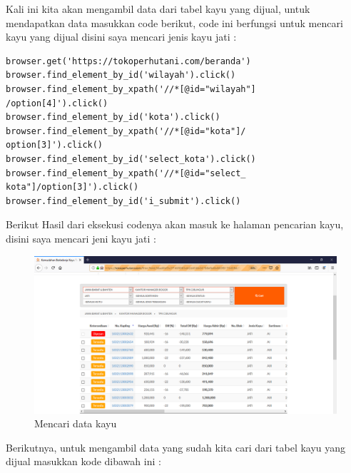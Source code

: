 Kali ini kita akan mengambil data dari tabel kayu yang dijual, untuk mendapatkan data masukkan code berikut, code ini berfungsi untuk mencari kayu yang dijual disini saya mencari jenis kayu jati :

\begin{verbatim}
browser.get('https://tokoperhutani.com/beranda')
browser.find_element_by_id('wilayah').click()
browser.find_element_by_xpath('//*[@id="wilayah"]
/option[4]').click()
browser.find_element_by_id('kota').click()
browser.find_element_by_xpath('//*[@id="kota"]/
option[3]').click()
browser.find_element_by_id('select_kota').click()
browser.find_element_by_xpath('//*[@id="select_
kota"]/option[3]').click()
browser.find_element_by_id('i_submit').click()
\end{verbatim}
Berikut Hasil dari eksekusi codenya akan masuk ke halaman pencarian kayu, disini saya mencari jeni kayu jati  :
\begin{figure}[h]
	\centering
	\includegraphics[scale=0.3]{figures/T7_1}
	\caption{Mencari data kayu}
\end{figure}

Berikutnya, untuk mengambil data yang sudah kita cari dari tabel kayu yang dijual masukkan kode dibawah ini :

